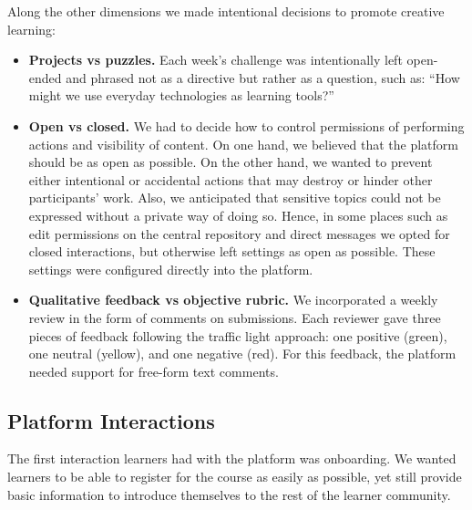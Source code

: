 \documentclass[12pt,twoside]{mitthesis}
\begin{document}
{Along the other dimensions we made intentional decisions to promote creative learning:
\begin{itemize}
\item \textbf{Projects vs puzzles.} Each week's challenge was intentionally left open-ended and phrased not as a directive but rather as a question, such as: ``How might we use everyday technologies as learning tools?''
\item \textbf{Open vs closed.} We had to decide how to control permissions of performing actions and visibility of content. On one hand, we believed that the platform should be as open as possible. On the other hand, we wanted to prevent either intentional or accidental actions that may destroy or hinder other participants' work. Also, we anticipated that sensitive topics could not be expressed without a private way of doing so. Hence, in some places such as edit permissions on the central repository and direct messages we opted for closed interactions, but otherwise left settings as open as possible. These settings were configured directly into the platform.
\item \textbf{Qualitative feedback vs objective rubric.} We incorporated a weekly review in the form of comments on submissions. Each reviewer gave three pieces of feedback following the traffic light approach: one positive (green), one neutral (yellow), and one negative (red). For this feedback, the platform needed support for free-form text comments.
\end{itemize}
}

\subsection{Platform Interactions}

The first interaction learners had with the platform was onboarding. We wanted learners to be able to register for the course as easily as possible, yet still provide basic information to introduce themselves to the rest of the learner community.
\end{document}
